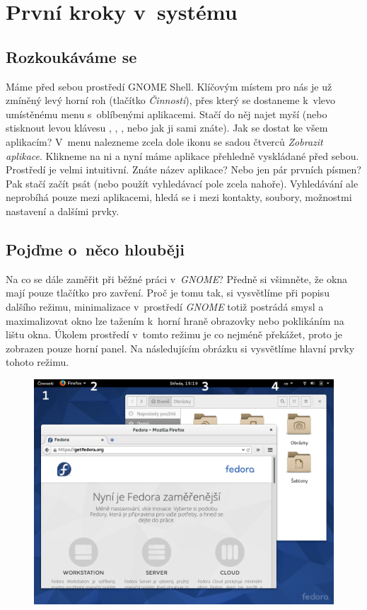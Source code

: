 \chapter*{První kroky v~systému}

\section*{Rozkoukáváme se}
Máme před sebou prostředí GNOME Shell. Klíčovým místem pro nás je už zmíněný levý horní roh (tlačítko \emph{Činnosti}), přes který se dostaneme k~vlevo umístěnému menu s~oblíbenými aplikacemi. Stačí do něj najet myší (nebo stisknout levou klávesu , , , nebo jak ji sami znáte). Jak se dostat ke všem aplikacím? V~menu nalezneme zcela dole ikonu se sadou čtverců \emph{Zobrazit aplikace}. Klikneme na ni a nyní máme aplikace přehledně vyskládané před sebou. Prostředí je velmi intuitivní. Znáte název aplikace? Nebo jen pár prvních písmen? Pak stačí začít psát (nebo použít vyhledávací pole zcela nahoře). Vyhledávání ale neprobíhá pouze mezi aplikacemi, hledá se i mezi kontakty, soubory, možnostmi nastavení a dalšími prvky.

\section*{Pojďme o~něco hlouběji}
Na co se dále zaměřit při běžné práci v~\emph{GNOME}? Předně si všimněte, že okna mají pouze tlačítko pro zavření. Proč je tomu tak, si vysvětlíme při popisu dalšího režimu, minimalizace v~prostředí \emph{GNOME} totiž postrádá smysl a maximalizovat okno lze tažením k~horní hraně obrazovky nebo poklikáním na lištu okna. Úkolem prostředí v~tomto režimu je co nejméně překážet, proto je zobrazen pouze horní panel. Na následujícím obrázku si vysvětlíme hlavní prvky tohoto režimu.

\begin{figure}[t]
\begin{center}
\includegraphics[width=\textwidth]{img/shell-a}
 \label{fig:shell-a}
\end{center}
\end{figure}

